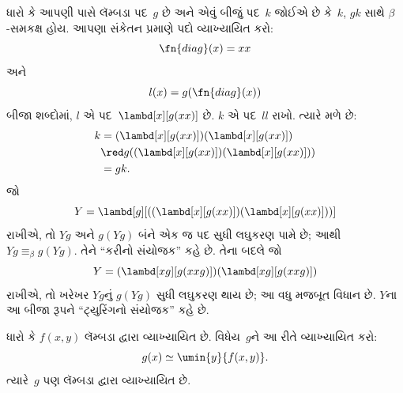 \endgroup


\begingroup
\makeatletter{}\makeatother

\label{guunit:OLP-0354}


ધારો કે આપણી પાસે લૅમ્બડા પદ~$g$ છે અને એવું બીજું પદ~$k$ જોઈએ છે
કે~$k$, $gk$ સાથે $\beta$-સમકક્ષ હોય. આપણા સંકેતન પ્રમાણે પદો
વ્યાખ્યાયિત કરો:
\[
\fn{diag}(x) = xx
\]
અને
\[
l(x) = g(\fn{diag}(x))
\]
બીજા શબ્દોમાં, $l$ એ પદ~$\lambd[x][g(xx)]$ છે. $k$ એ પદ~$ll$
રાખો. ત્યારે મળે છે:
\begin{align*}
k & = (\lambd[x][g(xx)])(\lambd[x][g(xx)]) \\
& \red  g((\lambd[x][g(xx)])(\lambd[x][g(xx)])) \\
& = gk.
\end{align*}
જો
\[
Y = \lambd[g][((\lambd[x][g(xx)])(\lambd[x][g(xx)]))]
\]
રાખીએ, તો $Yg$ અને $g(Yg)$ બંને એક જ પદ સુધી લઘુકરણ પામે છે;
આથી $Yg \equiv_\beta g(Yg)$. તેને ``કરીનો સંયોજક'' કહે છે. તેના
બદલે જો
\[
Y = (\lambd[xg][g(xxg)])(\lambd[xg][g(xxg)])
\]
રાખીએ, તો ખરેખર $Yg$નું $g(Yg)$ સુધી લઘુકરણ થાય છે; આ વધુ
મજબૂત વિધાન છે. $Y$ના આ બીજા રૂપને ``ટ્યુરિંગનો સંયોજક'' કહે છે.
\endgroup


\begingroup
\makeatletter{}\makeatother

\label{guunit:OLP-0355}


\begin{lem}
ધારો કે $f(x,y)$ લૅમ્બડા દ્વારા વ્યાખ્યાયિત છે. વિધેય~$g$ને
આ રીતે વ્યાખ્યાયિત કરો:
\[
g(x) \simeq \umin{y}{f(x,y)}.
\]
ત્યારે~$g$ પણ લૅમ્બડા દ્વારા વ્યાખ્યાયિત છે.
\end{lem}

